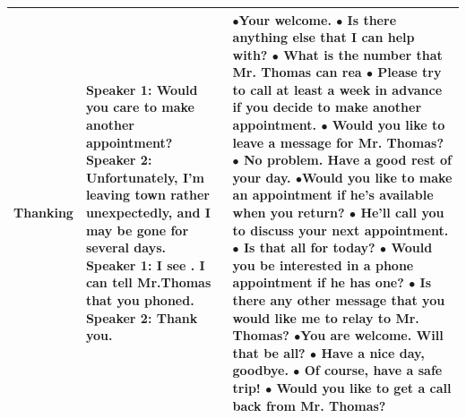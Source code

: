 \documentclass[11pt]{article}
\begin{document}
\begin{longtable}{|p{2cm}|p{3cm}|p{10cm}|}
 Thanking & \textbf{Speaker 1:} Would you care to make another appointment? \newline \hspace*{0.5cm} \textbf{Speaker 2:} Unfortunately, I'm leaving town rather unexpectedly, and I may be gone for several days. \newline \textbf{Speaker 1:} I see . I can tell Mr.Thomas that you phoned. \newline \hspace*{0.5cm} \textbf{Speaker 2:} Thank you. & $\bullet$Your welcome. \newline $\bullet$ Is there anything else that I can help with? \newline $\bullet$ What is the number that Mr. Thomas can rea \newline $\bullet$ Please try to call at least a week in advance if you decide to make another appointment. \newline $\bullet$ Would you like to leave a message for Mr. Thomas? \newline \newline $\bullet$ No problem. Have a good rest of your day. \newline $\bullet$Would you like to make an appointment if he's available when you return? \newline $\bullet$ He'll call you to discuss your next appointment. \newline $\bullet$ Is that all for today? \newline $\bullet$ Would you be interested in a phone appointment if he has one? \newline \newline $\bullet$ Is there any other message that you would like me to relay to Mr. Thomas? \newline $\bullet$You are welcome. Will that be all? \newline $\bullet$ Have a nice day, goodbye. \newline $\bullet$ Of course, have a safe trip! \newline $\bullet$ Would you like to get a call back from Mr. Thomas?\\\hline\hline

\end{longtable}
\end{document}
